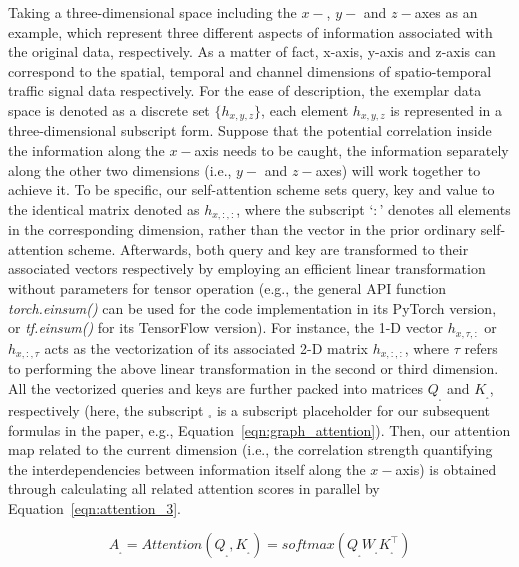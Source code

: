 Taking a three-dimensional space including the $x-$, $y-$ and $z-$axes as an example, which represent three different aspects of information associated with the original data, respectively. As a matter of fact, x-axis, y-axis and z-axis can correspond to the spatial, temporal and channel dimensions of spatio-temporal traffic signal data respectively. For the ease of description, the exemplar data space is denoted as a discrete set $\{h_{x,y,z}\}$, each element  $h_{x,y,z}$ is represented in a three-dimensional subscript form. Suppose that the potential correlation inside the information along the $x-$axis needs to be caught, the information separately along the other two dimensions (i.e., $y-$ and $z-$axes) will work together to achieve it. To be specific, our self-attention scheme sets query, key and value to the identical matrix denoted as $h_{x,:,:}$, where the subscript ‘$:$’ denotes all elements in the corresponding dimension, rather than the vector in the prior ordinary self-attention scheme. Afterwards, both query and key are transformed to their associated vectors respectively by employing an efficient linear transformation without parameters for tensor operation (e.g., the general API function \textit{torch.einsum()} can be used for the code implementation in its PyTorch version, or \textit{tf.einsum()} for its TensorFlow version). For instance, the 1-D vector $h_{x,\tau,:}$ or $h_{x,:,\tau}$ acts as the vectorization of its associated 2-D matrix $h_{x,:,:}$, where $\tau$ refers to performing the above linear transformation in the second or third dimension. All the vectorized queries and keys are further packed into matrices $Q_{_\square}$ and $K_{_\square}$, respectively (here, the subscript ${_\square}$ is a subscript placeholder for our subsequent formulas in the paper, e.g., Equation~\ref{eqn:graph_attention}). Then, our attention map related to the current dimension (i.e., the correlation strength quantifying the interdependencies between information itself along the $x-$axis) is obtained through calculating all related attention scores in parallel by Equation~\ref{eqn:attention_3}.

\begin{equation}
    \label{eqn:attention_3}
    A_{_\square} = Attention(Q_{_\square}, K_{_\square}) = softmax(Q_{_\square} W_{_\square} K_{_\square}^\top)
\end{equation}

